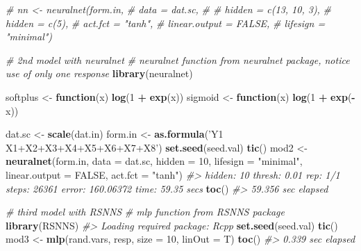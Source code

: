 \documentclass[]{book}
\newenvironment{Shaded}{\begin{snugshade}}{\end{snugshade}}
\newcommand{\CommentTok}[1]{\textcolor[rgb]{0.56,0.35,0.01}{\textit{#1}}}
\newcommand{\ControlFlowTok}[1]{\textcolor[rgb]{0.13,0.29,0.53}{\textbf{#1}}}
\newcommand{\DataTypeTok}[1]{\textcolor[rgb]{0.13,0.29,0.53}{#1}}
\newcommand{\DecValTok}[1]{\textcolor[rgb]{0.00,0.00,0.81}{#1}}
\newcommand{\KeywordTok}[1]{\textcolor[rgb]{0.13,0.29,0.53}{\textbf{#1}}}
\newcommand{\NormalTok}[1]{#1}
\newcommand{\OperatorTok}[1]{\textcolor[rgb]{0.81,0.36,0.00}{\textbf{#1}}}
\newcommand{\OtherTok}[1]{\textcolor[rgb]{0.56,0.35,0.01}{#1}}
\newcommand{\StringTok}[1]{\textcolor[rgb]{0.31,0.60,0.02}{#1}}
\begin{document}
\begin{Shaded}
\begin{Highlighting}[]
\CommentTok{# nn <- neuralnet(form.in,}
\CommentTok{#                 data = dat.sc,}
\CommentTok{#                 # hidden = c(13, 10, 3),}
\CommentTok{#                 hidden = c(5),}
\CommentTok{#                 act.fct = "tanh",}
\CommentTok{#                 linear.output = FALSE,}
\CommentTok{#                 lifesign = "minimal")}
\end{Highlighting}
\end{Shaded}

\begin{Shaded}
\begin{Highlighting}[]
\CommentTok{# 2nd model with neuralnet}
\CommentTok{# neuralnet function from neuralnet package, notice use of only one response}
\KeywordTok{library}\NormalTok{(neuralnet)}

\NormalTok{softplus <-}\StringTok{ }\ControlFlowTok{function}\NormalTok{(x) }\KeywordTok{log}\NormalTok{(}\DecValTok{1} \OperatorTok{+}\StringTok{ }\KeywordTok{exp}\NormalTok{(x))}
\NormalTok{sigmoid  <-}\StringTok{ }\ControlFlowTok{function}\NormalTok{(x) }\KeywordTok{log}\NormalTok{(}\DecValTok{1} \OperatorTok{+}\StringTok{ }\KeywordTok{exp}\NormalTok{(}\OperatorTok{-}\NormalTok{x))}

\NormalTok{dat.sc <-}\StringTok{ }\KeywordTok{scale}\NormalTok{(dat.in)}
\NormalTok{form.in <-}\StringTok{ }\KeywordTok{as.formula}\NormalTok{(}\StringTok{'Y1 ~ X1+X2+X3+X4+X5+X6+X7+X8'}\NormalTok{)}
\KeywordTok{set.seed}\NormalTok{(seed.val)}
\KeywordTok{tic}\NormalTok{()}
\NormalTok{mod2 <-}\StringTok{ }\KeywordTok{neuralnet}\NormalTok{(form.in, }\DataTypeTok{data =}\NormalTok{ dat.sc, }\DataTypeTok{hidden =} \DecValTok{10}\NormalTok{, }\DataTypeTok{lifesign =} \StringTok{"minimal"}\NormalTok{,}
                  \DataTypeTok{linear.output =} \OtherTok{FALSE}\NormalTok{,}
                  \DataTypeTok{act.fct =} \StringTok{"tanh"}\NormalTok{)}
\CommentTok{#> hidden: 10    thresh: 0.01    rep: 1/1    steps:   26361 error: 160.06372    time: 59.35 secs}
\KeywordTok{toc}\NormalTok{()}
\CommentTok{#> 59.356 sec elapsed}
\end{Highlighting}
\end{Shaded}

\begin{Shaded}
\begin{Highlighting}[]
\CommentTok{# third model with RSNNS}
\CommentTok{# mlp function from RSNNS package}
\KeywordTok{library}\NormalTok{(RSNNS)}
\CommentTok{#> Loading required package: Rcpp}
\KeywordTok{set.seed}\NormalTok{(seed.val)}
\KeywordTok{tic}\NormalTok{()}
\NormalTok{mod3 <-}\StringTok{ }\KeywordTok{mlp}\NormalTok{(rand.vars, resp, }\DataTypeTok{size =} \DecValTok{10}\NormalTok{, }\DataTypeTok{linOut =}\NormalTok{ T)}
\KeywordTok{toc}\NormalTok{()}
\CommentTok{#> 0.339 sec elapsed}
\end{Highlighting}
\end{Shaded}
\end{document}

